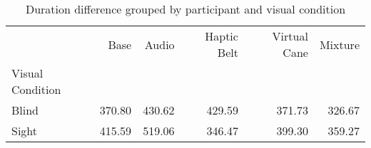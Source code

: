 
\begin{table}[!htb]
\centering
\caption{Duration difference grouped by participant and visual condition}
\label{tab:duracao_average_group}
\begin{tabular}{lrrrrr}
\toprule
{} &    Base &   Audio & Haptic Belt & Virtual Cane & Mixture \\
Visual Condition &         &         &             &              &         \\
\midrule
Blind            &  370.80 &  430.62 &      429.59 &       371.73 &  326.67 \\
Sight            &  415.59 &  519.06 &      346.47 &       399.30 &  359.27 \\
\bottomrule
\end{tabular}
\end{table}

